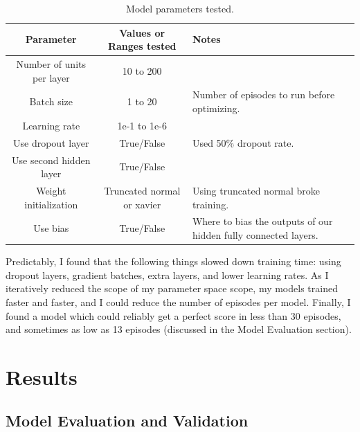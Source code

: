 \documentclass[12pt,a4paper]{article}
\begin{document}
\begin{table}

\begin{center}
\begin{tabular}{ c  c p{5cm}}
  Parameter & Values or Ranges tested & Notes  \\
  \hline
  Number of units per layer & 10 to 200 &  \\
  Batch size & 1 to 20 &  Number of episodes to run before optimizing.\\
  Learning rate& 1e-1 to 1e-6 & \\
  Use dropout layer & True/False & Used 50\% dropout rate. \\
  Use second hidden layer & True/False & \\
  Weight initialization & Truncated normal or xavier & Using truncated normal broke training.\\
  Use bias & True/False & Where to bias the outputs of our hidden fully connected layers.\\

\end{tabular}
\caption{Model parameters tested.}
\label{table:param_space}
\end{center}

\end{table}

Predictably, I found that the following things slowed down training time: using dropout layers, gradient batches, extra layers, and lower learning rates. As I iteratively reduced the scope of my parameter space scope, my models trained faster and faster, and I could reduce the number of episodes per model. Finally, I found a model which could reliably get a perfect score in less than 30 episodes, and sometimes as low as 13 episodes (discussed in the Model Evaluation section).



\section{Results}
%
\subsection*{Model Evaluation and Validation}
\end{document}

